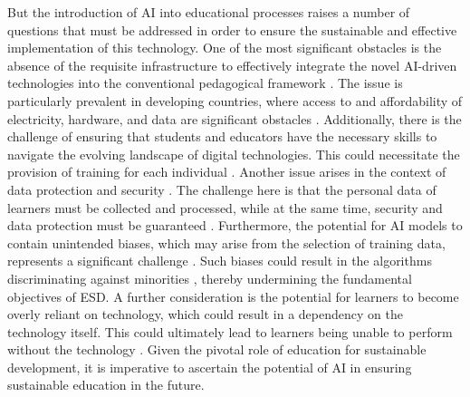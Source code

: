 \documentclass[]{lni}
\begin{document}
But the introduction of AI into educational processes raises a number of questions that must be addressed in order to ensure the 
sustainable and effective implementation of this technology.
One of the most significant obstacles is the absence of the requisite infrastructure to effectively integrate the novel AI-driven technologies 
into the conventional pedagogical framework 
\cite{Lin2023}. 
%
The issue is particularly prevalent in developing countries, where access to and affordability of electricity, hardware, and data are significant obstacles
\cite{Tanveer2020}. 
%
Additionally, there is the challenge of ensuring that students and educators have the necessary skills to navigate the evolving landscape of digital technologies.
This could necessitate the provision of training for each individual 
\cite{Tanveer2020} \cite{10409934}.
%
Another issue arises in the context of data protection and security \cite{Lin2023}. The challenge here is that the personal data of learners must be collected and processed, 
while at the same time, security and data protection must be guaranteed \cite{Tanveer2020}.   
%
Furthermore, the potential for AI models to contain unintended biases, which may arise from the selection of training data, represents a significant challenge \cite{Lin2023}. 
Such biases could result in the algorithms discriminating against minorities \cite{angwin2022machine}, thereby undermining the fundamental objectives of ESD.
%
A further consideration is the potential for learners to become overly reliant on technology, which could result in a dependency on the technology itself. This could ultimately 
lead to learners being unable to perform without the technology \cite{Chin2010}.
%
Given the pivotal role of education for sustainable development, it is imperative to ascertain the potential of AI in ensuring sustainable education in the future.



\printbibliography %
\end{document}
